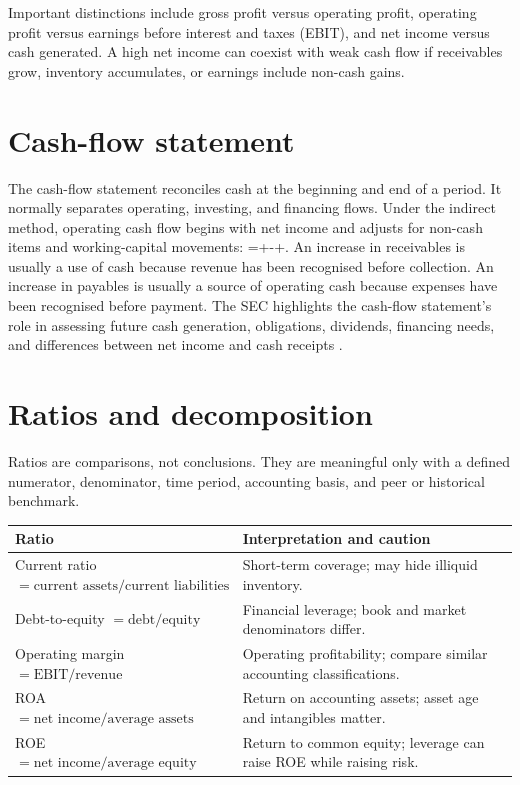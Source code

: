 Important distinctions include gross profit versus operating profit, operating profit versus earnings before interest and taxes (EBIT), and net income versus cash generated. A high net income can coexist with weak cash flow if receivables grow, inventory accumulates, or earnings include non-cash gains.

\section{Cash-flow statement}
The cash-flow statement reconciles cash at the beginning and end of a period. It normally separates operating, investing, and financing flows. Under the indirect method, operating cash flow begins with net income and adjusts for non-cash items and working-capital movements:
  =+-\Delta{}+\Delta{}.
\closeformula
An increase in receivables is usually a use of cash because revenue has been recognised before collection. An increase in payables is usually a source of operating cash because expenses have been recognised before payment. The SEC highlights the cash-flow statement's role in assessing future cash generation, obligations, dividends, financing needs, and differences between net income and cash receipts \cite{secfinancialstatements}.

\section{Ratios and decomposition}
Ratios are comparisons, not conclusions. They are meaningful only with a defined numerator, denominator, time period, accounting basis, and peer or historical benchmark.

\begin{center}
\begin{tabularx}{\textwidth}{@{}l>{\raggedright\arraybackslash}X@{}}
\toprule
Ratio & Interpretation and caution \\
\midrule
Current ratio $=\text{current assets}/\text{current liabilities}$ & Short-term coverage; may hide illiquid inventory. \\
Debt-to-equity $=\text{debt}/\text{equity}$ & Financial leverage; book and market denominators differ. \\
Operating margin $=\text{EBIT}/\text{revenue}$ & Operating profitability; compare similar accounting classifications. \\
ROA $=\text{net income}/\text{average assets}$ & Return on accounting assets; asset age and intangibles matter. \\
ROE $=\text{net income}/\text{average equity}$ & Return to common equity; leverage can raise ROE while raising risk. \\
\bottomrule
\end{tabularx}
\end{center}

